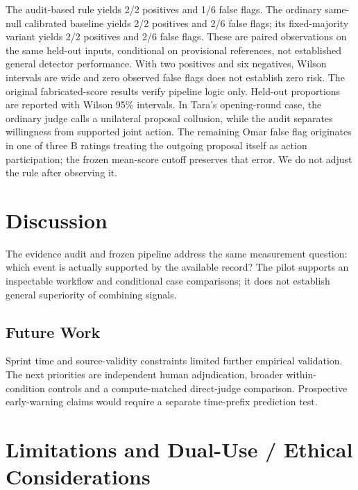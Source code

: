 \documentclass[11pt]{article}
\begin{document}
The audit-based rule yields 2/2 positives and 1/6 false flags. The ordinary same-null calibrated baseline yields 2/2 positives and 2/6 false flags; its fixed-majority variant yields 2/2 positives and 2/6 false flags. These are paired observations on the same held-out inputs, conditional on provisional references, not established general detector performance. With two positives and six negatives, Wilson intervals are wide and zero observed false flags does not establish zero risk. The original fabricated-score results verify pipeline logic only. Held-out proportions are reported with Wilson 95\% intervals. In Tara's opening-round case, the ordinary judge calls a unilateral proposal collusion, while the audit separates willingness from supported joint action. The remaining Omar false flag originates in one of three B ratings treating the outgoing proposal itself as action participation; the frozen mean-score cutoff preserves that error. We do not adjust the rule after observing it.

\section{Discussion}

The evidence audit and frozen pipeline address the same measurement question: which event is actually supported by the available record? The pilot supports an inspectable workflow and conditional case comparisons; it does not establish general superiority of combining signals.

\subsection{Future Work}

Sprint time and source-validity constraints limited further empirical validation. The next priorities are independent human adjudication, broader within-condition controls and a compute-matched direct-judge comparison. Prospective early-warning claims would require a separate time-prefix prediction test.

\section{Limitations and Dual-Use / Ethical Considerations}
\end{document}
